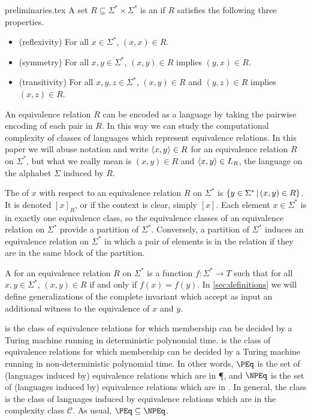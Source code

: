 \begin{filecontents}{preliminaries.tex}
A set $R \subseteq \Sigma^* \times \Sigma^*$ is an  if $R$ satisfies the following three properties.
\begin{itemize}
\item (reflexivity) For all $x \in \Sigma^*$, $(x,x)\in R$.
\item (symmetry) For all $x,y\in \Sigma^*$, $(x,y)\in R$ implies $(y,x)\in R$.
\item (transitivity) For all $x,y,z\in \Sigma^*$, $(x,y)\in R$ and $(y,z)\in R$ implies $(x,z)\in R$.
\end{itemize}
An equivalence relation $R$ can be encoded as a language by taking the pairwise encoding of each pair in $R$.
In this way we can study the computational complexity of classes of languages which represent equivalence relations.
In this paper we will abuse notation and write $\pair{x}{y}\in R$ for an equivalence relation $R$ on $\Sigma^*$, but what we really mean is $(x,y)\in R$ and $\pair{x}{y}\in L_R$, the language on the alphabet $\Sigma$ induced by $R$.

The  of $x$ with respect to an equivalence relation $R$ on $\Sigma^*$ is $\lb y\in \Sigma^* \st (x,y)\in R \rb$.
It is denoted $[x]_R$, or if the context is clear, simply $[x]$.
Each element $x\in \Sigma^*$ is in exactly one equivalence class, so the equivalence classes of an equivalence relation on $\Sigma^*$ provide a partition of $\Sigma^*$.
Conversely, a partition of $\Sigma^*$ induces an equivalence relation on $\Sigma^*$ in which a pair of elements is in the relation if they are in the same block of the partition.

A  for an equivalence relation $R$ on $\Sigma^*$ is a function $f\colon \Sigma^*\to T$ such that for all $x,y\in \Sigma^*$, $(x,y)\in R$ if and only if $f(x)=f(y)$.
In \ref{sec:definitions} we will define generalizations of the complete invariant which accept as input an additional witness to the equivalence of $x$ and $y$.

 is the class of equivalence relations for which membership can be decided by a Turing machine running in deterministic polynomial time.
 is the class of equivalence relations for which membership can be decided by a Turing machine running in non-deterministic polynomial time.
In other words, $\PEq$ is the set of (languages induced by) equivalence relations which are in \P, and $\NPEq$ is the set of (languages induced by) equivalence relations which are in \NP.
In general, the class  is the class of languages induced by equivalence relations which are in the complexity class $\mathcal{C}$.
As usual, $\PEq\subseteq\NPEq$.


\end{filecontents}
